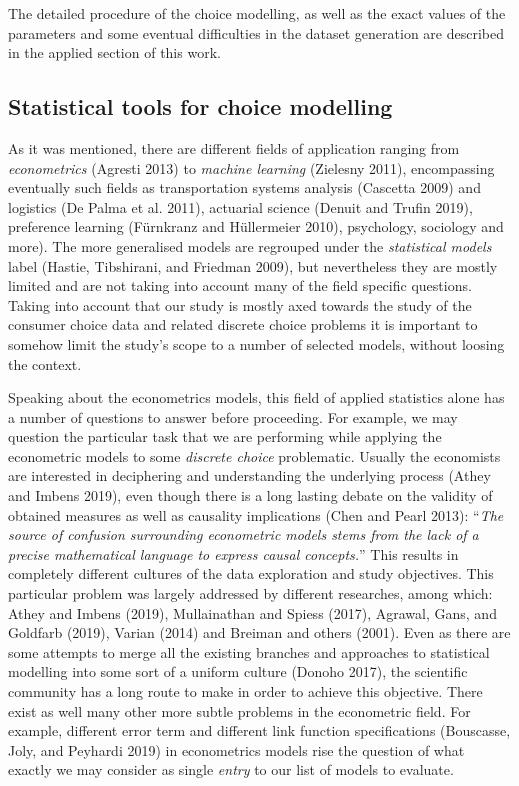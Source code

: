 \documentclass[12pt,]{article}
\begin{document}
The detailed procedure of the choice modelling, as well as the exact
values of the parameters and some eventual difficulties in the dataset
generation are described in the applied section of this work.

\hypertarget{statistical-tools-for-choice-modelling}{%
\subsection{Statistical tools for choice
modelling}\label{statistical-tools-for-choice-modelling}}

As it was mentioned, there are different fields of application ranging
from \emph{econometrics} (Agresti 2013) to \emph{machine learning}
(Zielesny 2011), encompassing eventually such fields as transportation
systems analysis (Cascetta 2009) and logistics (De Palma et al. 2011),
actuarial science (Denuit and Trufin 2019), preference learning
(Fürnkranz and Hüllermeier 2010), psychology, sociology and more). The
more generalised models are regrouped under the \emph{statistical
models} label (Hastie, Tibshirani, and Friedman 2009), but nevertheless
they are mostly limited and are not taking into account many of the
field specific questions. Taking into account that our study is mostly
axed towards the study of the consumer choice data and related discrete
choice problems it is important to somehow limit the study's scope to a
number of selected models, without loosing the context.

Speaking about the econometrics models, this field of applied statistics
alone has a number of questions to answer before proceeding. For
example, we may question the particular task that we are performing
while applying the econometric models to some \emph{discrete choice}
problematic. Usually the economists are interested in deciphering and
understanding the underlying process (Athey and Imbens 2019), even
though there is a long lasting debate on the validity of obtained
measures as well as causality implications (Chen and Pearl 2013):
``\emph{The source of confusion surrounding econometric models stems
from the lack of a precise mathematical language to express causal
concepts.}'' This results in completely different cultures of the data
exploration and study objectives. This particular problem was largely
addressed by different researches, among which: Athey and Imbens (2019),
Mullainathan and Spiess (2017), Agrawal, Gans, and Goldfarb (2019),
Varian (2014) and Breiman and others (2001). Even as there are some
attempts to merge all the existing branches and approaches to
statistical modelling into some sort of a uniform culture (Donoho 2017),
the scientific community has a long route to make in order to achieve
this objective. There exist as well many other more subtle problems in
the econometric field. For example, different error term and different
link function specifications (Bouscasse, Joly, and Peyhardi 2019) in
econometrics models rise the question of what exactly we may consider as
single \emph{entry} to our list of models to evaluate.
\end{document}
